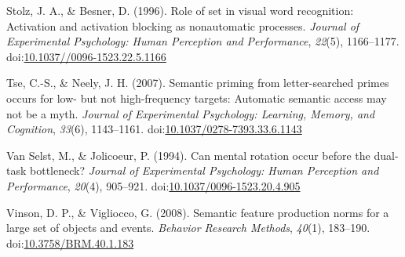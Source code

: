 \documentclass[english,man]{apa6}
\theoremstyle{definition}
\theoremstyle{definition}
\theoremstyle{definition}
\theoremstyle{remark}
\begin{document}
\hypertarget{ref-Stolz1996a}{}
Stolz, J. A., \& Besner, D. (1996). Role of set in visual word
recognition: Activation and activation blocking as nonautomatic
processes. \emph{Journal of Experimental Psychology: Human Perception
and Performance}, \emph{22}(5), 1166--1177.
doi:\href{https://doi.org/10.1037//0096-1523.22.5.1166}{10.1037//0096-1523.22.5.1166}

\hypertarget{ref-Tse2007}{}
Tse, C.-S., \& Neely, J. H. (2007). Semantic priming from
letter-searched primes occurs for low- but not high-frequency targets:
Automatic semantic access may not be a myth. \emph{Journal of
Experimental Psychology: Learning, Memory, and Cognition}, \emph{33}(6),
1143--1161.
doi:\href{https://doi.org/10.1037/0278-7393.33.6.1143}{10.1037/0278-7393.33.6.1143}

\hypertarget{ref-VanSelst1994}{}
Van Selst, M., \& Jolicoeur, P. (1994). Can mental rotation occur before
the dual-task bottleneck? \emph{Journal of Experimental Psychology:
Human Perception and Performance}, \emph{20}(4), 905--921.
doi:\href{https://doi.org/10.1037/0096-1523.20.4.905}{10.1037/0096-1523.20.4.905}

\hypertarget{ref-Vinson2008}{}
Vinson, D. P., \& Vigliocco, G. (2008). Semantic feature production
norms for a large set of objects and events. \emph{Behavior Research
Methods}, \emph{40}(1), 183--190.
doi:\href{https://doi.org/10.3758/BRM.40.1.183}{10.3758/BRM.40.1.183}
\end{document}
